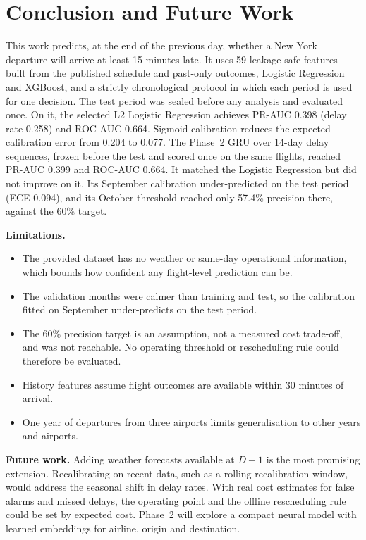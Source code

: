 \section{Conclusion and Future Work}
\label{sec:conclusion}

This work predicts, at the end of the previous day, whether a New York departure will arrive at
least 15 minutes late. It uses 59 leakage-safe features built from the published schedule and
past-only outcomes, Logistic Regression and XGBoost, and a strictly chronological protocol in
which each period is used for one decision. The test period was sealed before any analysis and
evaluated once. On it, the selected L2 Logistic Regression achieves PR-AUC 0.398 (delay rate 0.258)
and ROC-AUC 0.664. Sigmoid calibration reduces the expected calibration error from 0.204 to 0.077.
The Phase~2 GRU over 14-day delay sequences, frozen before the test and scored once on the
same flights, reached PR-AUC 0.399 and ROC-AUC 0.664. It matched the Logistic Regression but did
not improve on it. Its September calibration under-predicted on the test period (ECE 0.094), and
its October threshold reached only 57.4\% precision there, against the 60\% target.

\textbf{Limitations.}
\begin{itemize}
  \item The provided dataset has no weather or same-day operational information, which bounds
  how confident any flight-level prediction can be.
  \item The validation months were calmer than training and test, so the calibration fitted on
  September under-predicts on the test period.
  \item The 60\% precision target is an assumption, not a measured cost trade-off, and was not
  reachable. No operating threshold or rescheduling rule could therefore be evaluated.
  \item History features assume flight outcomes are available within 30 minutes of arrival.
  \item One year of departures from three airports limits generalisation to other years and
  airports.
\end{itemize}

\textbf{Future work.} Adding weather forecasts available at $D{-}1$ is the most promising
extension. Recalibrating on recent data, such as a rolling recalibration window, would address the
seasonal shift in delay rates. With real cost estimates for false alarms and missed delays, the
operating point and the offline rescheduling rule could be set by expected cost. Phase~2 will
explore a compact neural model with learned embeddings for airline, origin and destination.
